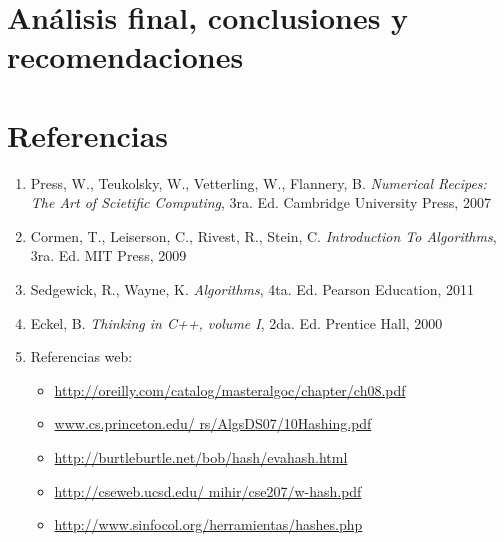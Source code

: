 \documentclass[letterpaper]{article}
\begin{document}
\section{Análisis final, conclusiones y recomendaciones}

\section{Referencias}

\begin{enumerate}
\item Press, W., Teukolsky, W., Vetterling, W., Flannery, B. \textit{Numerical Recipes: The Art of Scietific Computing}, 3ra. Ed. Cambridge University Press, 2007
\item Cormen, T., Leiserson, C., Rivest, R., Stein, C. \textit{Introduction To Algorithms}, 3ra. Ed. MIT Press, 2009
\item Sedgewick, R., Wayne, K. \textit{Algorithms}, 4ta. Ed. Pearson Education, 2011
\item Eckel, B. \textit{Thinking in C++, volume I}, 2da. Ed. Prentice Hall, 2000
\item Referencias web: \begin{itemize}
	\item \url{http://oreilly.com/catalog/masteralgoc/chapter/ch08.pdf}
	\item \url{www.cs.princeton.edu/ rs/AlgsDS07/10Hashing.pdf}
	\item \url{http://burtleburtle.net/bob/hash/evahash.html}
	\item \url{http://cseweb.ucsd.edu/ mihir/cse207/w-hash.pdf}
	\item \url{http://www.sinfocol.org/herramientas/hashes.php}
	
	\end{itemize}
\end{enumerate}
	
\end{document}
